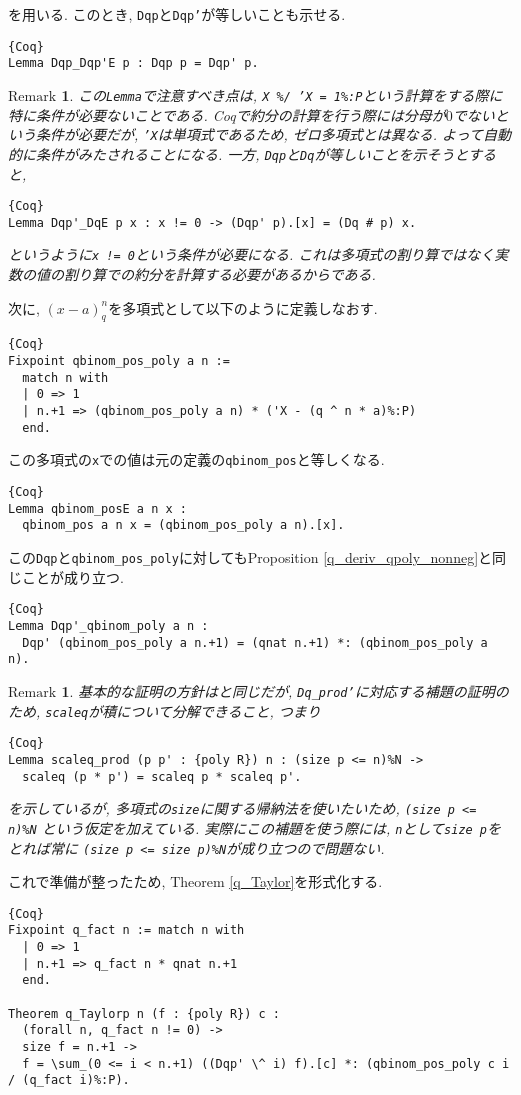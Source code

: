\documentclass[11pt]{jarticle}
\theoremstyle{mystyle}
\newtheorem{rmk}[df]{$\textrm{Remark}$}
\newcommand{\brmk}{\begin{rmk}}
\newcommand{\ermk}{\end{rmk}}
\newcommand{\0}{\textbf{0}}
\newcommand{\1}{\textbf{1}}
\newcommand{\2}{\textbf{2}}
\begin{document}
を用いる. このとき, {\tt Dqp}と{\tt Dqp'}が等しいことも示せる. 
\begin{lstlisting}{Coq}
Lemma Dqp_Dqp'E p : Dqp p = Dqp' p.
\end{lstlisting}
\brmk
この{\tt Lemma}で注意すべき点は, {\tt X \%/ 'X = 1\%:P}という計算をする際に特に条件が必要ないことである. Coqで約分の計算を行う際には分母が$0$でないという条件が必要だが, {\tt 'X}は単項式であるため, ゼロ多項式とは異なる. よって自動的に条件がみたされることになる. 
一方, {\tt Dqp}と{\tt Dq}が等しいことを示そうとすると, 
\begin{lstlisting}{Coq}
Lemma Dqp'_DqE p x : x != 0 -> (Dqp' p).[x] = (Dq # p) x.
\end{lstlisting}
というように{\tt x != 0}という条件が必要になる. これは多項式の割り算ではなく実数の値の割り算での約分を計算する必要があるからである.
\ermk
次に, $(x - a)^n_q$を多項式として以下のように定義しなおす. 
\begin{lstlisting}{Coq}
Fixpoint qbinom_pos_poly a n :=
  match n with
  | 0 => 1
  | n.+1 => (qbinom_pos_poly a n) * ('X - (q ^ n * a)%:P)
  end.
\end{lstlisting}
この多項式の{\tt x}での値は元の定義の{\tt qbinom\_pos}と等しくなる. 
\begin{lstlisting}{Coq}
Lemma qbinom_posE a n x :
  qbinom_pos a n x = (qbinom_pos_poly a n).[x].
\end{lstlisting}
この{\tt Dqp}と{\tt qbinom\_pos\_poly}に対してもProposition \ref{q_deriv_qpoly_nonneg}と同じことが成り立つ. 
\begin{lstlisting}{Coq}
Lemma Dqp'_qbinom_poly a n :
  Dqp' (qbinom_pos_poly a n.+1) = (qnat n.+1) *: (qbinom_pos_poly a n).
\end{lstlisting}
\brmk
  基本的な証明の方針は\cite{Kac}と同じだが, {\tt Dq\_prod'}に対応する補題の証明のため, 
  {\tt scaleq}が積について分解できること, つまり
  \begin{lstlisting}{Coq}
Lemma scaleq_prod (p p' : {poly R}) n : (size p <= n)%N ->
  scaleq (p * p') = scaleq p * scaleq p'. \end{lstlisting}
  を示しているが, 多項式の{\tt size}に関する帰納法を使いたいため, {\tt (size p <= n)\%N}
  という仮定を加えている. 実際にこの補題を使う際には, {\tt n}として{\tt size p}をとれば常に
  {\tt (size p <= size p)\%N}が成り立つので問題ない. 
\ermk
これで準備が整ったため, Theorem \ref{q_Taylor}を形式化する. 
\begin{lstlisting}{Coq}
Fixpoint q_fact n := match n with
  | 0 => 1
  | n.+1 => q_fact n * qnat n.+1
  end.

Theorem q_Taylorp n (f : {poly R}) c :
  (forall n, q_fact n != 0) ->
  size f = n.+1 ->
  f = \sum_(0 <= i < n.+1) ((Dqp' \^ i) f).[c] *: (qbinom_pos_poly c i / (q_fact i)%:P).
\end{lstlisting}
\end{document}
